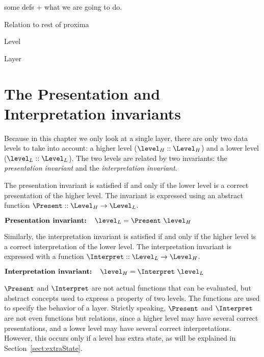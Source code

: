 some defs + what we are going to do.

Relation to rest of proxima

Level

Layer


%																
%																
%																
\section{The Presentation and Interpretation invariants}


Because in this chapter we only look at a single layer, there are only two data levels to take into account: a higher level ($\level_{H} :: \Level_{H}$) and a lower level ($\level_{L} :: \Level_{L}$). The two levels are related by two invariants: the {\em presentation invariant} and the {\em interpretation invariant}. 

The presentation invariant is satisfied if and only if the lower level is a correct presentation of the higher level. The invariant is expressed using an abstract function 
$\Present ::  \Level_{H} \rightarrow \Level_{L}$.

\begin{small}\begin{math}
\text{\bf Presentation invariant:~~~} \level_{L} = \Present~\level_{H}\\
\end{math}\end{small}

Similarly, the interpretation invariant is satisfied if and only if the higher level is a correct interpretation of the lower level. The interpretation invariant is expressed with a function 
$\Interpret ::  \Level_{L} \rightarrow \Level_{H}$.

\begin{small}\begin{math}
\text{\bf Interpretation invariant:~~~} \level_{H} = \Interpret~\level_{L}\\
\end{math}\end{small}

$\Present$ and $\Interpret$ are not actual functions that can be evaluated, but abstract concepts used to express a property of two levels. The functions are used to specify the behavior of a layer.
Strictly speaking, $\Present$ and $\Interpret$ are not even functions but relations, since a higher level may have several correct presentations, and a lower level may have several correct interpretations. However, this occurs only if a level has extra state, as will be explained in Section~\ref{sect:extraState}.

